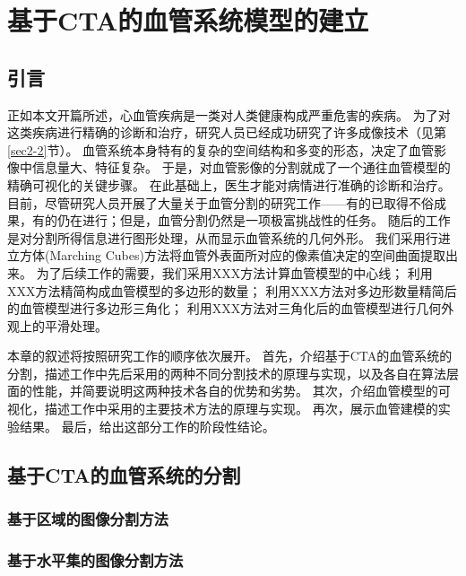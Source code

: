 \chapter{基于CTA的血管系统模型的建立}
\label{chap3} \fontsize{12pt}{12pt}\selectfont

\section{引言}

正如本文开篇所述，心血管疾病是一类对人类健康构成严重危害的疾病。
为了对这类疾病进行精确的诊断和治疗，研究人员已经成功研究了许多成像技术（见第\ref{sec2-2}节）。
血管系统本身特有的复杂的空间结构和多变的形态，决定了血管影像中信息量大、特征复杂。
于是，对血管影像的分割就成了一个通往血管模型的精确可视化的关键步骤。
在此基础上，医生才能对病情进行准确的诊断和治疗。
目前，尽管研究人员开展了大量关于血管分割的研究工作——有的已取得不俗成果，有的仍在进行；但是，血管分割仍然是一项极富挑战性的任务\cite{Lesage2009Review}。
随后的工作是对分割所得信息进行图形处理，从而显示血管系统的几何外形。
我们采用行进立方体(Marching Cubes)方法\cite{Lorensen1987MC}将血管外表面所对应的像素值决定的空间曲面提取出来。
为了后续工作的需要，我们采用XXX方法计算血管模型的中心线；
利用XXX方法精简构成血管模型的多边形的数量；
利用XXX方法对多边形数量精简后的血管模型进行多边形三角化；
利用XXX方法对三角化后的血管模型进行几何外观上的平滑处理。

本章的叙述将按照研究工作的顺序依次展开。
首先，介绍基于CTA的血管系统的分割，描述工作中先后采用的两种不同分割技术的原理与实现，以及各自在算法层面的性能，并简要说明这两种技术各自的优势和劣势。
其次，介绍血管模型的可视化，描述工作中采用的主要技术方法的原理与实现。
再次，展示血管建模的实验结果。
最后，给出这部分工作的阶段性结论。

\section{基于CTA的血管系统的分割}

\subsection{基于区域的图像分割方法}

\subsection{基于水平集的图像分割方法}


